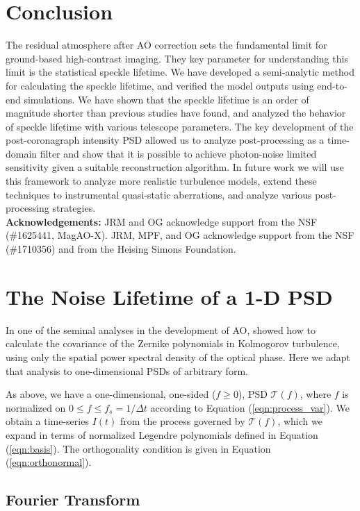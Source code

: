 \documentclass[10pt,preprint]{aastex631}
\begin{document}
\section{Conclusion}
The residual atmosphere after AO correction sets the fundamental limit for ground-based high-contrast imaging.  They key parameter for understanding this limit is the statistical speckle lifetime.  We have developed a semi-analytic method for calculating the speckle lifetime, and verified the model outputs using end-to-end simulations.  We have shown that the speckle lifetime is an order of magnitude shorter than previous studies have found, and analyzed the behavior of speckle lifetime with various telescope parameters.  The key development of the post-coronagraph intensity PSD allowed us to analyze post-processing as a time-domain filter and show that it is possible to achieve photon-noise limited sensitivity given a suitable reconstruction algorithm. In future work we will use this framework to analyze more realistic turbulence models, extend these techniques to instrumental quasi-static aberrations, and analyze various post-processing strategies.  \\

\noindent \textbf{Acknowledgements:} JRM and OG acknowledge support from the NSF (\#1625441, MagAO-X).  JRM, MPF, and OG acknowledge support from the NSF (\#1710356) and from the Heising Simons Foundation.

\appendix
\section{The Noise Lifetime of a 1-D PSD}
\label{app:tau_psd}

In one of the seminal analyses in the development of AO, \citet{1976JOSA...66..207N} showed how to calculate the covariance of the Zernike polynomials in Kolmogorov turbulence, using only the spatial power spectral density of the optical phase. Here we adapt that analysis to one-dimensional PSDs of arbitrary form.  

As above, we have a one-dimensional, one-sided ($f \ge 0$),  PSD $\mathcal{T}(f)$, where $f$ is normalized on $0 \leq f \leq f_s = 1/\Delta t$ according to Equation (\ref{eqn:process_var}).  We obtain a time-series $I(t)$ from the process governed by $\mathcal{T}(f)$, which we expand in terms of normalized Legendre polynomials defined in Equation (\ref{eqn:basis}).  The orthogonality condition is given in Equation (\ref{eqn:orthonormal}).
 
\subsection{Fourier Transform}
\end{document}
